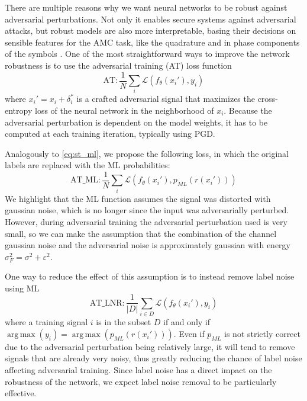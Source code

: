 \documentclass[conference]{IEEEtran}
\newcommand{\Ls}{\mathcal{L}}
\DeclareMathOperator*{\argmax}{arg\,max}
\begin{document}
There are multiple reasons why we want neural networks to be robust against adversarial perturbations. Not only it enables secure systems against adversarial attacks, but robust models are also more interpretable, basing their decisions on sensible features for the AMC task, like the quadrature and in phase components of the symbols \cite{maroto2021safeamc}. One of the most straightforward ways to improve the network robustness is to use the adversarial training (AT) loss function
\begin{equation}
    \text{AT} : \dfrac{1}{N}\sum_{i}\Ls(f_{\theta}(x_i'), y_i)
\end{equation}
where $x_i' = x_i + \delta_i^*$ is a crafted adversarial signal that maximizes the cross-entropy loss of the neural network in the neighborhood of $x_i$. Because the adversarial perturbation is dependent on the model weights, it has to be computed at each training iteration, typically using PGD.

Analogously to \eqref{eq:st_ml}, we propose the following loss, in which the original labels are replaced with the ML probabilities:
\begin{equation}
    \text{AT\_ML} : \dfrac{1}{N}\sum_{i}\Ls(f_{\theta}(x_i'), p_{ML}(r(x_i')))
\end{equation}
We highlight that the ML function assumes the signal was distorted with gaussian noise, which is no longer since the input was adversarially perturbed. However, during adversarial training the adversarial perturbation used is very small, so we can make the assumption that the combination of the channel gaussian noise and the adversarial noise is approximately gaussian with energy $\sigma_F^{2} = \sigma^{2} + \varepsilon^{2}$.

One way to reduce the effect of this assumption is to instead remove label noise using ML
\begin{equation}
    \text{AT\_LNR} : \dfrac{1}{|D|}\sum_{i \in D}\Ls(f_{\theta}(x_i'), y_i)
\end{equation}
where a training signal $i$ is in the subset $D$ if and only if $\argmax(y_i) = \argmax(p_{ML}(r(x_i')))$. Even if $p_{ML}$ is not strictly correct due to the adversarial perturbation being relatively large, it will tend to remove signals that are already very noisy, thus greatly reducing the chance of label noise affecting adversarial training. Since label noise has a direct impact on the robustness of the network, we expect label noise removal to be particularly effective.
\end{document}
